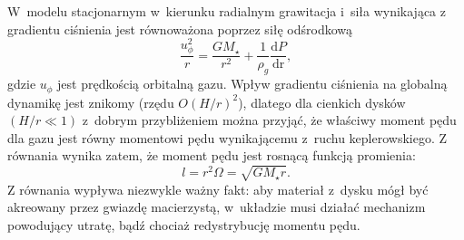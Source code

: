 %
\par W~modelu stacjonarnym w~kierunku radialnym grawitacja i~siła wynikająca z
gradientu ciśnienia jest równoważona poprzez siłę odśrodkową
%
\begin{equation}\label{eq:radial_balance}
\frac{u_\phi^2}{r} = \frac{GM_\star}{r^2} +
  \frac{1}{\rho_g}\frac{\textrm{d}P}{\textrm{dr}},
\end{equation}
%
gdzie $u_\phi$ jest prędkością orbitalną gazu. Wpływ gradientu ciśnienia na
globalną dynamikę jest znikomy (rzędu $O(H/r)^2$), dlatego dla cienkich dysków
$(H/r \ll 1)$ z~dobrym przybliżeniem można przyjąć, że właściwy moment pędu dla
gazu jest równy momentowi pędu wynikającemu z~ruchu keplerowskiego. Z równania
 wynika zatem, że moment pędu jest rosnącą funkcją
promienia:
\begin{equation}\label{eq:angmom}
l = r^2\Omega = \sqrt{GM_\star r}.
\end{equation}
Z równania  wypływa niezwykle ważny fakt: aby materiał z~dysku
mógł być akreowany przez gwiazdę macierzystą, w~układzie musi działać mechanizm
powodujący utratę, bądź chociaż redystrybucję momentu pędu.
